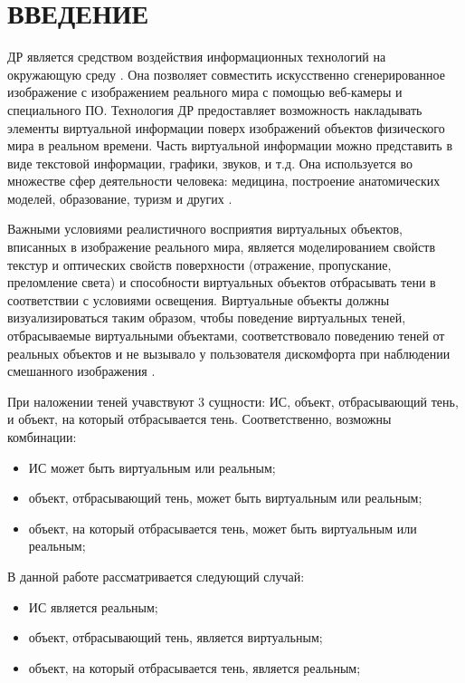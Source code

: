 \chapter*{ВВЕДЕНИЕ}

ДР является средством воздействия информационных технологий на окружающую среду \cite{osti2019real}. Она позволяет совместить искусственно сгенерированное изображение с изображением реального мира с помощью веб-камеры и специального ПО. Технология ДР предоставляет возможность накладывать элементы виртуальной информации поверх изображений объектов физического мира в реальном времени. Часть виртуальной информации можно представить в виде текстовой информации, графики, звуков, и т.д. Она используется во множестве сфер деятельности человека: медицина, построение анатомических моделей, образование, туризм и других \cite{tech-ar}.

Важными условиями реалистичного восприятия виртуальных объектов, вписанных в изображение реального мира, является моделированием свойств текстур и оптических свойств поверхности (отражение, пропускание, преломление света) и способности виртуальных объектов отбрасывать тени в соответствии с условиями освещения. Виртуальные объекты должны визуализироваться таким образом, чтобы поведение виртуальных теней, отбрасываемые виртуальными объектами, соответствовало поведению теней от реальных объектов и не вызывало у пользователя дискомфорта при наблюдении смешанного изображения \cite{bogdanov}.

При наложении теней учавствуют 3 сущности: ИС, объект, отбрасывающий тень, и объект, на который отбрасывается тень. Соответственно, возможны комбинации:

\begin{itemize}
	\item ИС может быть виртуальным или реальным;
	\item объект, отбрасывающий тень, может быть виртуальным или реальным;
	\item объект, на который отбрасывается тень, может быть виртуальным или реальным;
\end{itemize}

В данной работе рассматривается следующий случай:

\begin{itemize}
	\item ИС является реальным;
	\item объект, отбрасывающий тень, является виртуальным;
	\item объект, на который отбрасывается тень, является реальным;
\end{itemize}

